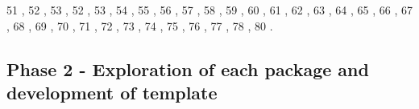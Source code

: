 51 \citep{R-nnlib2Rcpp}, 52
\citep{R-onnx}, 53 \citep{R-OptimClassifier},
52 \citep{R-OSTSC}, 53 \citep{R-pnn},
54 \citep{R-polyreg}, 55
\citep{R-predictoR}, 56 \citep{R-qrnn},
57 \citep{R-QuantumOps}, 58
\citep{R-quarrint}, 59 \citep{R-radiant.model},
60 \citep{R-rasclass}, 61
\citep{R-rcane}, 62 \citep{R-regressoR},
63 \citep{R-rminer}, 64 \citep{R-rnn},
65 \citep{R-RSNNS}, 66 \citep{R-ruta},
67 \citep{R-simpleNeural}, 68
\citep{R-snnR}, 69 \citep{R-softmaxreg},
70 \citep{R-Sojourn.Data}, 71
\citep{R-spnn}, 72 \citep{R-TeachNet},
73 \citep{R-tensorflow}, 74
\citep{R-tfestimators}, 75 \citep{R-trackdem},
76 \citep{R-TrafficBDE}, 77
\citep{R-tsensembler}, 78 \citep{R-validann},
80 \citep{R-zFactor}.

\hypertarget{phase-2---exploration-of-each-package-and-development-of-template}{%
\subsection{Phase 2 - Exploration of each package and development of
template}\label{phase-2---exploration-of-each-package-and-development-of-template}}

